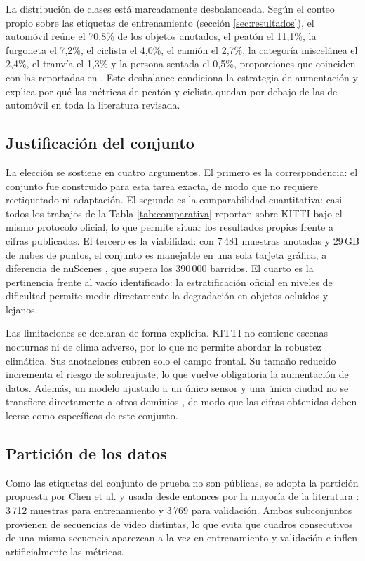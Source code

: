 \documentclass[11pt,letterpaper]{article}
\begin{document}
La distribución de clases está marcadamente desbalanceada. Según el conteo propio sobre las etiquetas de entrenamiento (sección \ref{sec:resultados}), el automóvil reúne el 70,8\% de los objetos anotados, el peatón el 11,1\%, la furgoneta el 7,2\%, el ciclista el 4,0\%, el camión el 2,7\%, la categoría miscelánea el 2,4\%, el tranvía el 1,3\% y la persona sentada el 0,5\%, proporciones que coinciden con las reportadas en \cite{wirges2018}. Este desbalance condiciona la estrategia de aumentación y explica por qué las métricas de peatón y ciclista quedan por debajo de las de automóvil en toda la literatura revisada.

\subsection{Justificación del conjunto}

La elección se sostiene en cuatro argumentos. El primero es la correspondencia: el conjunto fue construido para esta tarea exacta, de modo que no requiere reetiquetado ni adaptación. El segundo es la comparabilidad cuantitativa: casi todos los trabajos de la Tabla \ref{tab:comparativa} reportan sobre KITTI bajo el mismo protocolo oficial, lo que permite situar los resultados propios frente a cifras publicadas. El tercero es la viabilidad: con 7\,481 muestras anotadas y 29\,GB de nubes de puntos, el conjunto es manejable en una sola tarjeta gráfica, a diferencia de nuScenes \cite{caesar2020}, que supera los 390\,000 barridos. El cuarto es la pertinencia frente al vacío identificado: la estratificación oficial en niveles de dificultad permite medir directamente la degradación en objetos ocluidos y lejanos.

Las limitaciones se declaran de forma explícita. KITTI no contiene escenas nocturnas ni de clima adverso, por lo que no permite abordar la robustez climática. Sus anotaciones cubren solo el campo frontal. Su tamaño reducido incrementa el riesgo de sobreajuste, lo que vuelve obligatoria la aumentación de datos. Además, un modelo ajustado a un único sensor y una única ciudad no se transfiere directamente a otros dominios \cite{sohail2025}, de modo que las cifras obtenidas deben leerse como específicas de este conjunto.

\subsection{Partición de los datos}

Como las etiquetas del conjunto de prueba no son públicas, se adopta la partición propuesta por Chen et al. \cite{chen2015} y usada desde entonces por la mayoría de la literatura \cite{yan2018, shi2020, deng2021}: 3\,712 muestras para entrenamiento y 3\,769 para validación. Ambos subconjuntos provienen de secuencias de video distintas, lo que evita que cuadros consecutivos de una misma secuencia aparezcan a la vez en entrenamiento y validación e inflen artificialmente las métricas.
\end{document}
